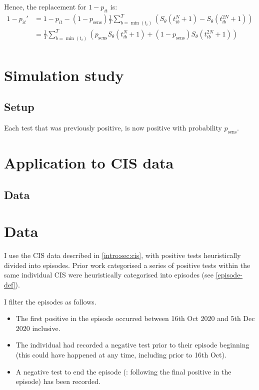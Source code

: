 \documentclass[thesis.tex]{subfiles}
\begin{document}
Hence, the replacement for $1 - p_{it}$ is:
\begin{align}
1 - p_{it}'
&= 1 - p_{it} - (1 - p_\text{sens})\frac{1}{T} \sum_{b=\min(t_i)}^T \left( S_\theta(t_{ib}^N + 1) - S_\theta(t_{ib}^{2N} + 1)\right) \\
&= \frac{1}{T} \sum_{b=\min(t_i)}^T \left( p_\text{sens} S_\theta(t_{ib}^N + 1) + (1 - p_\text{sens}) S_\theta(t_{ib}^{2N} + 1)\right) \\
\end{align}

\section{Simulation study}

\subsection{Setup}

Each test that was previously positive, is now positive with probability $p_\text{sens}$.

\section{Application to CIS data}

\subsection{Data}

\section{Data}

I use the CIS data described in \cref{intro:sec:cis}, with positive tests heuristically divided into episodes.
Prior work categorised a series of positive tests within the same individual CIS were heuristically categorised into episodes (see \cref{episode-def}).

I filter the episodes as follows.
\begin{itemize}
\item
  The first positive in the episode occurred between 16th Oct 2020 and
  5th Dec 2020 inclusive.
\item
  The individual had recorded a negative test prior to their episode
  beginning (this could have happened at any time, including prior to
  16th Oct).
\item
  A negative test to end the episode (\ie: following the final positive in the episode) has been recorded.
\end{itemize}

\end{document}
